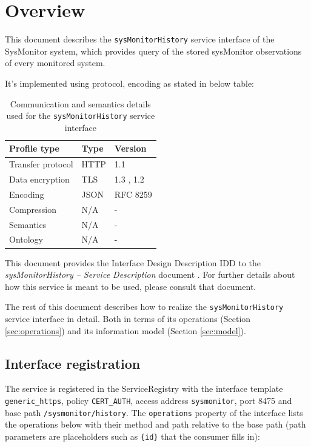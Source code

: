 \documentclass[a4paper]{arrowhead}
\begin{document}
\section{Overview}
\label{sec:overview}

This document describes the \texttt{sysMonitorHistory} service interface of the SysMonitor system, which provides query of the stored sysMonitor observations of every monitored system.

It's implemented using protocol, encoding as stated in below table:
\begin{table}[ht!]
  \centering
  \begin{tabular}{|l|l|l|}
    \hline
    \rowcolor{gray!33} Profile type & Type & Version \\ \hline
    Transfer protocol & HTTP & 1.1 \cite{rfc9112} \\ \hline
    Data encryption & TLS & 1.3 \cite{rfc8446}, 1.2 \cite{rfc5246} \\ \hline
    Encoding & JSON & RFC 8259 \cite{rfc8259} \\ \hline
    Compression & N/A & - \\ \hline
    Semantics & N/A & - \\ \hline
    Ontology & N/A & - \\ \hline
  \end{tabular}
  \caption{Communication and semantics details used for the \texttt{sysMonitorHistory} service interface}
  \label{tab:comunication_semantics_profile}
\end{table}

This document provides the Interface Design Description IDD to the \textit{sysMonitorHistory -- Service Description} document \cite{smo-sysMonitorHistory-sd}.
For further details about how this service is meant to be used, please consult that document.

The rest of this document describes how to realize the \texttt{sysMonitorHistory} service
interface in detail. Both in terms of its operations (Section \ref{sec:operations}) and its information model (Section \ref{sec:model}).

\subsection{Interface registration}

The service is registered in the ServiceRegistry with the interface template \texttt{generic\_\allowbreak{}https}, policy \texttt{CERT\_\allowbreak{}AUTH}, access address \texttt{sysmonitor}, port 8475 and base path \texttt{/\allowbreak{}sysmonitor/\allowbreak{}history}. The \texttt{operations} property of the interface lists the operations below with their method and path relative to the base path (path parameters are placeholders such as \texttt{\{id\}} that the consumer fills in):
\end{document}
